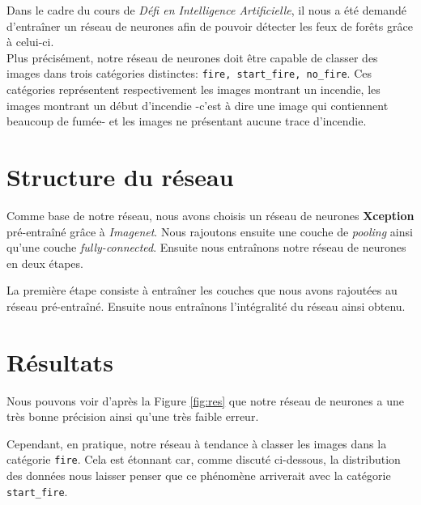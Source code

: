 \documentclass[10pt,a4paper]{article}
\begin{document}
   		Dans le cadre du cours de \textit{Défi en Intelligence Artificielle}, il nous a été demandé d'entraîner un réseau de neurones afin de pouvoir détecter les feux de forêts grâce à celui-ci.\\
   		Plus précisément, notre réseau de neurones doit être capable de classer des images dans trois catégories distinctes: \texttt{fire, start\_fire, no\_fire}. Ces catégories représentent respectivement les images montrant un incendie, les images montrant un début d'incendie -c'est à dire une image qui contiennent beaucoup de fumée- et les images ne présentant aucune trace d'incendie.
   		
   	\section{Structure du réseau}
   	
   		Comme base de notre réseau, nous avons choisis un réseau de neurones \textbf{Xception} pré-entraîné grâce à \textit{Imagenet}. Nous rajoutons ensuite une couche de \textit{pooling} ainsi qu'une couche \textit{fully-connected}. Ensuite nous entraînons notre réseau de neurones en deux étapes. 
   		
   		La première étape consiste à entraîner les couches que nous avons rajoutées au réseau pré-entraîné. Ensuite nous entraînons l'intégralité du réseau ainsi obtenu.
   	
   	\section{Résultats}
   	
   		Nous pouvons voir d'après la Figure \ref{fig:res} que notre réseau de neurones a une très bonne précision ainsi qu'une très faible erreur.
   		
   		Cependant, en pratique, notre réseau à tendance à classer les images dans la catégorie \texttt{fire}. Cela est étonnant car, comme discuté ci-dessous, la distribution des données nous laisser penser que ce phénomène arriverait avec la catégorie \texttt{start\_fire}.
   		
\end{document}
